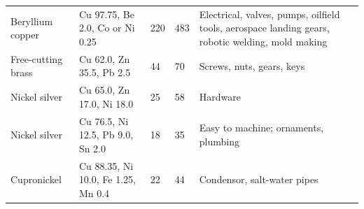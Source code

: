 \documentclass[
10pt,
a4paper,
openany,
svgnames,
]{book}
\begin{document}
\begin{table}[H]
{\begin{tabular}{lL{3cm}llL{4cm}}
    Beryllium copper     & Cu 97.75, Be 2.0, Co or Ni 0.25          & 220          & 483             & Electrical, valves, pumps, oilfield tools, aerospace landing gears, robotic welding, mold making \\
    Free-cutting brass   & Cu 62.0, Zn 35.5, Pb 2.5                 & 44          & 70             & Screws, nuts, gears, keys                                                                                \\
    Nickel silver        & Cu 65.0, Zn 17.0, Ni 18.0                & 25          & 58             & Hardware                                                                                                 \\
    Nickel silver        & Cu 76.5, Ni 12.5, Pb 9.0, Sn 2.0         & 18          & 35             & Easy to machine; ornaments, plumbing                                                            \\
    Cupronickel          & Cu 88.35, Ni 10.0, Fe 1.25, Mn 0.4       & 22          & 44             & Condensor, salt-water pipes                                                                              \\
    \bottomrule
  \end{tabular}}
\end{table}
\end{document}
